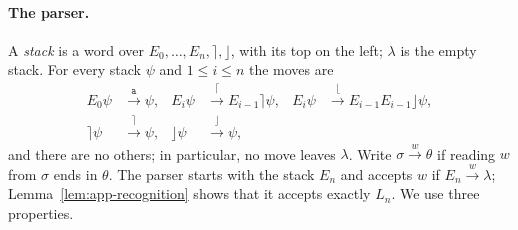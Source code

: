 \documentclass[11pt,a4paper]{article}
\theoremstyle{remark}
\theoremstyle{plain}
\begin{document}
\paragraph{The parser.}
A \emph{stack} is a word over $E_0,\ldots,E_n,\rceil,\rfloor$, with its
top on the left; $\lambda$ is the empty stack. For every stack $\psi$
and $1\le i\le n$ the moves are
\[
\begin{aligned}
E_0\psi&\xrightarrow{\mathtt a}\psi,&
E_i\psi&\xrightarrow{\lceil}E_{i-1}\rceil\psi,&
E_i\psi&\xrightarrow{\lfloor}E_{i-1}E_{i-1}\rfloor\psi,\\
\rceil\psi&\xrightarrow{\rceil}\psi,&
\rfloor\psi&\xrightarrow{\rfloor}\psi,
\end{aligned}
\]
and there are no others; in particular, no move leaves $\lambda$.
Write $\sigma\xrightarrow{w}\theta$ if reading $w$ from $\sigma$ ends
in $\theta$. The parser starts with the stack $E_n$ and accepts $w$ if
$E_n\xrightarrow{w}\lambda$; Lemma~\ref{lem:app-recognition} shows that
it accepts exactly $L_n$. We use three properties.
\end{document}
